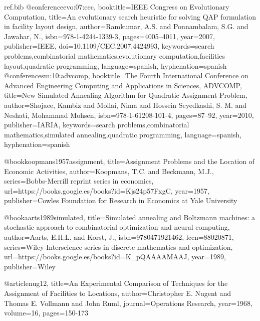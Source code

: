 %
% 
% 
% 

\begin{filecontents*}{ref.bib}
@conference{evo:07:cec,
  booktitle={IEEE Congress on Evolutionary Computation},
  title={An evolutionary search heuristic for solving QAP formulation in facility layout design},
  author={Ramkumar, A.S. and Ponnambalam, S.G. and Jawahar, N.},
  isbn={978-1-4244-1339-3},
  pages={4005--4011},
  year={2007},
  publisher={IEEE},
  doi={10.1109/CEC.2007.4424993},
  keywords={search problems,combinatorial mathematics,evolutionary computation,facilities layout,quadratic programming},
  language={spanish},
  hyphenation={spanish}
}
@conference{sm:10:advcomp,
  booktitle={The Fourth International Conference on Advanced Engineering Computing and Applications in Sciences, ADVCOMP},
  title={New Simulated Annealing Algorithm for Quadratic Assignment Problem},
  author={Shojaee, Kambiz and Mollai, Nima and Hossein Seyedkashi, S. M. and Neshati, Mohammad Mohsen},
  isbn={978-1-61208-101-4},
  pages={87--92},
  year={2010},
  publisher={IARIA},
  keywords={search problems,combinatorial mathematics,simulated annealing,quadratic programming},
  language={spanish},
  hyphenation={spanish}
}

@book{koopmans1957assignment,
  title={Assignment Problems and the Location of Economic Activities},
  author={Koopmans, T.C. and Beckmann, M.J.},
  series={Bobbs-Merrill reprint series in economics},
  url={https://books.google.es/books?id=Kjs24p57FxgC},
  year={1957},
  publisher={Cowles Foundation for Research in Economics at Yale University}
}

@book{aarts1989simulated,
  title={Simulated annealing and Boltzmann machines: a stochastic approach to combinatorial optimization and neural computing},
  author={Aarts, E.H.L. and Korst, J.},
  isbn={9780471921462},
  lccn={88020871},
  series={Wiley-Interscience series in discrete mathematics and optimization},
  url={https://books.google.es/books?id=K\_pQAAAAMAAJ},
  year={1989},
  publisher={Wiley}
}

@article{nug12,
  title={An Experimental Comparison of Techniques for the Assignment of Facilities to Locations},
  author={Christopher E. Nugent and Thomas E. Vollmann and John Ruml},
  journal={Operations Research},
  year={1968},
  volume={16},
  pages={150-173}
}


\end{filecontents*}
